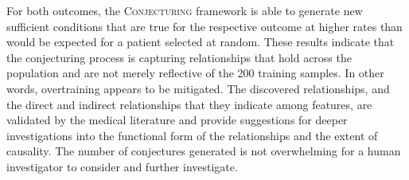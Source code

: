 \documentclass[ijds,nonblindrev]{informs-ijds}
\begin{document}
% 
%
%
%



For both outcomes, the \textsc{Conjecturing} framework is able to generate new sufficient conditions that are true for the respective outcome at higher rates than would be expected for a patient selected at random.  These results indicate that the conjecturing process is capturing relationships that hold across the population and are not merely reflective of the 200 training samples.  In other words, overtraining appears to be mitigated.  
The discovered relationships, and the direct and indirect relationships that they indicate among features, are validated by the medical literature and provide suggestions for deeper investigations into the functional form of the relationships and the extent of causality.  
The number of conjectures generated is not overwhelming for a human investigator to consider and further investigate.  
\end{document}
